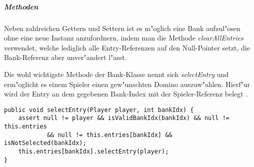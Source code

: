 \subparagraph{Methoden}
Neben zahlreichen Gettern und Settern ist es m"oglich eine Bank aufzul"osen ohne eine neue Instanz anzufordnern, indem man die Methode \emph{clearAllEntries} verwendet, welche lediglich alle Entry-Referenzen auf den Null-Pointer setzt, die Bank-Referenz aber unver"andert l"asst. 

Die wohl wichtigste Methode der Bank-Klasse nennt sich \emph{selectEntry} und erm"oglicht es einem Spieler einen gew"unschten Domino auszuw"ahlen. Hierf"ur wird der Entry an dem gegebenen Bank-Index mit der Spieler-Referenz belegt . 

\begin{lstlisting}[style=CodeHighlighting,float,caption=Bank - selectEntry,label=lst:bank_selectEntry]
public void selectEntry(Player player, int bankIdx) {
    assert null != player && isValidBankIdx(bankIdx) && null != this.entries
            && null != this.entries[bankIdx] && isNotSelected(bankIdx);
    this.entries[bankIdx].selectEntry(player);
}
\end{lstlisting}